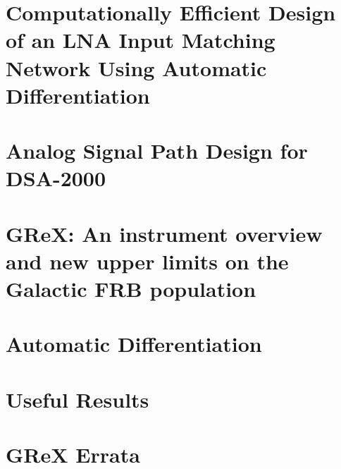 \documentclass[12pt]{caltech_thesis}
\begin{document}
\chapter{Computationally Efficient Design of an LNA Input Matching Network Using Automatic Differentiation} 
\label{ch:lna}
\begin{refsection}

\printbibliography[heading=subbibliography]
\end{refsection}

\chapter{Analog Signal Path Design for DSA-2000} \label{ch:asp}
\begin{refsection}

\printbibliography[heading=subbibliography]
\end{refsection}

\chapter{GReX: An instrument overview and new upper limits on the Galactic FRB population} \label{ch:grex}
\begin{refsection}

\printbibliography[heading=subbibliography]
\end{refsection}

\appendix

\chapter{Automatic Differentiation} \label{ch:ad_appen}
\begin{refsection}

\printbibliography[heading=subbibliography]
\end{refsection}

\chapter{Useful Results} \label{ch:eqns}
\begin{refsection}

\printbibliography[heading=subbibliography]
\end{refsection}

\chapter{GReX Errata}
\begin{refsection}

\printbibliography[heading=subbibliography]
\end{refsection}
\end{document}

